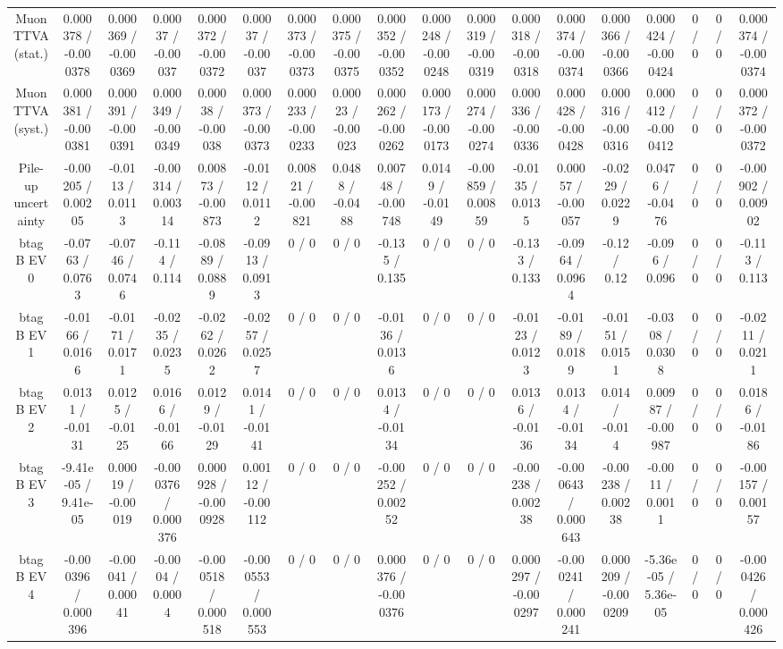 \documentclass[10pt]{article}
\begin{document}
\begin{table}[htbp]
\begin{center}
\begin{tabular}{|c|c|c|c|c|c|c|c|c|c|c|c|c|c|c|c|c|c|}
  Muon TTVA (stat.) & 0.000378 / -0.000378 & 0.000369 / -0.000369 & 0.00037 / -0.00037 & 0.000372 / -0.000372 & 0.00037 / -0.00037 & 0.000373 / -0.000373 & 0.000375 / -0.000375 & 0.000352 / -0.000352 & 0.000248 / -0.000248 & 0.000319 / -0.000319 & 0.000318 / -0.000318 & 0.000374 / -0.000374 & 0.000366 / -0.000366 & 0.000424 / -0.000424 & 0 / 0 & 0 / 0 & 0.000374 / -0.000374 \\ 
  Muon TTVA (syst.) & 0.000381 / -0.000381 & 0.000391 / -0.000391 & 0.000349 / -0.000349 & 0.00038 / -0.00038 & 0.000373 / -0.000373 & 0.000233 / -0.000233 & 0.00023 / -0.00023 & 0.000262 / -0.000262 & 0.000173 / -0.000173 & 0.000274 / -0.000274 & 0.000336 / -0.000336 & 0.000428 / -0.000428 & 0.000316 / -0.000316 & 0.000412 / -0.000412 & 0 / 0 & 0 / 0 & 0.000372 / -0.000372 \\ 
  Pile-up uncertainty & -0.00205 / 0.00205 & -0.0113 / 0.0113 & -0.00314 / 0.00314 & 0.00873 / -0.00873 & -0.0112 / 0.0112 & 0.00821 / -0.00821 & 0.0488 / -0.0488 & 0.00748 / -0.00748 & 0.0149 / -0.0149 & -0.00859 / 0.00859 & -0.0135 / 0.0135 & 0.00057 / -0.00057 & -0.0229 / 0.0229 & 0.0476 / -0.0476 & 0 / 0 & 0 / 0 & -0.00902 / 0.00902 \\ 
  btag B EV 0 & -0.0763 / 0.0763 & -0.0746 / 0.0746 & -0.114 / 0.114 & -0.0889 / 0.0889 & -0.0913 / 0.0913 & 0 / 0 & 0 / 0 & -0.135 / 0.135 & 0 / 0 & 0 / 0 & -0.133 / 0.133 & -0.0964 / 0.0964 & -0.12 / 0.12 & -0.096 / 0.096 & 0 / 0 & 0 / 0 & -0.113 / 0.113 \\ 
  btag B EV 1 & -0.0166 / 0.0166 & -0.0171 / 0.0171 & -0.0235 / 0.0235 & -0.0262 / 0.0262 & -0.0257 / 0.0257 & 0 / 0 & 0 / 0 & -0.0136 / 0.0136 & 0 / 0 & 0 / 0 & -0.0123 / 0.0123 & -0.0189 / 0.0189 & -0.0151 / 0.0151 & -0.0308 / 0.0308 & 0 / 0 & 0 / 0 & -0.0211 / 0.0211 \\ 
  btag B EV 2 & 0.0131 / -0.0131 & 0.0125 / -0.0125 & 0.0166 / -0.0166 & 0.0129 / -0.0129 & 0.0141 / -0.0141 & 0 / 0 & 0 / 0 & 0.0134 / -0.0134 & 0 / 0 & 0 / 0 & 0.0136 / -0.0136 & 0.0134 / -0.0134 & 0.014 / -0.014 & 0.00987 / -0.00987 & 0 / 0 & 0 / 0 & 0.0186 / -0.0186 \\ 
  btag B EV 3 & -9.41e-05 / 9.41e-05 & 0.00019 / -0.00019 & -0.000376 / 0.000376 & 0.000928 / -0.000928 & 0.00112 / -0.00112 & 0 / 0 & 0 / 0 & -0.00252 / 0.00252 & 0 / 0 & 0 / 0 & -0.00238 / 0.00238 & -0.000643 / 0.000643 & -0.00238 / 0.00238 & -0.0011 / 0.0011 & 0 / 0 & 0 / 0 & -0.00157 / 0.00157 \\ 
  btag B EV 4 & -0.000396 / 0.000396 & -0.00041 / 0.00041 & -0.0004 / 0.0004 & -0.000518 / 0.000518 & -0.000553 / 0.000553 & 0 / 0 & 0 / 0 & 0.000376 / -0.000376 & 0 / 0 & 0 / 0 & 0.000297 / -0.000297 & -0.000241 / 0.000241 & 0.000209 / -0.000209 & -5.36e-05 / 5.36e-05 & 0 / 0 & 0 / 0 & -0.000426 / 0.000426 \\ 

\end{tabular}
\end{center}
\end{table}
\end{document}
